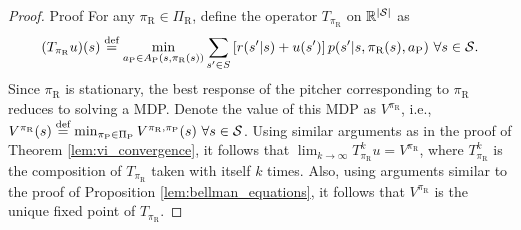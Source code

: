 \documentclass[aoas]{imsart}
\theoremstyle{plain}
\theoremstyle{definition}
\newcommand{\defeq}{\stackrel{\text{def}}{=}}
\newcommand{\abs}[1]{\left\lvert#1\right\rvert}
\begin{document}
       \begin{proof}{Proof}
           For any $\pi_\text{R} \in \Pi_\text{R}$, define the operator $T_{\pi_\text{R}}$ on $\mathbb{R}^{\abs{\cal S}}$ as 
           \begingroup
           \allowdisplaybreaks
           \begin{equation}
               \label{eqn:policy_iteration_temp1}
               (T_{\pi_\text{R}} u )(s) \defeq \min_{a_\text{P} \in A_\text{P}(s,\pi_\text{R}(s))}\sum_{s' \in S}\left[r(s'|s) + u(s')\right]p(s'|s,\pi_\text{R}(s),a_\text{P}) \ \forall s \in {\cal S}.
           \end{equation}
           \endgroup
           Since $\pi_\text{R}$ is stationary, the best response of the pitcher corresponding to $\pi_\text{R}$ reduces to solving a MDP. Denote the value of this MDP as $V^{\pi_\text{R}}$, i.e., $V^{\pi_\text{R}}(s) \defeq \min_{\pi_\text{P} \in \Pi_\text{P}} V^{\pi_\text{R},\pi_\text{P}}(s) \ \forall s \in {\cal S}$. Using similar arguments as in the proof of Theorem  \ref{lem:vi_convergence}, it follows that $\lim_{k \to \infty}T_{\pi_\text{R}}^k u = V^{\pi_\text{R}}$, where $T_{\pi_\text{R}}^k$ is the composition of $T_{\pi_\text{R}}$ taken with itself $k$ times.  Also, using arguments similar to the proof of Proposition  \ref{lem:bellman_equations}, it follows that $V^{\pi_\text{R}}$ is the unique fixed point of $T_{\pi_\text{R}}$.
    

\end{proof}
\end{document}
